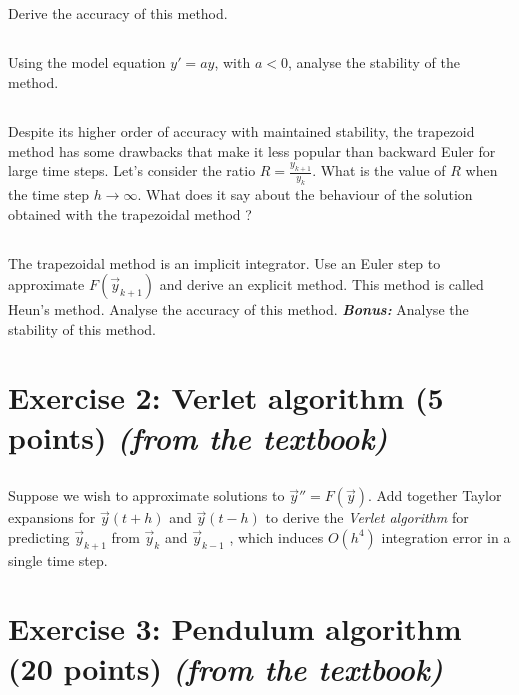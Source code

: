 \subsection{} Derive the accuracy of this method.

\subsection{} Using the model equation $y' = ay$, with $a < 0$, analyse the stability of the method.

\subsection{} Despite its higher order of accuracy with maintained stability, the trapezoid method has some drawbacks that make it less popular than backward Euler for large time steps. Let's consider the ratio $R = \frac{y_{k+1}}{y_k}$. What is the value of $R$ when the time step $h \to \infty$. What does it say about the behaviour of the solution obtained with the trapezoidal method ?

\subsection{} The trapezoidal method is an implicit integrator. Use an Euler step to approximate $F(\vec{y}_{k+1})$ and derive an explicit method. This method is called Heun's method. Analyse the accuracy of this method. \emph{\textbf{Bonus:}} Analyse the stability of this method.

\section*{Exercise 2: Verlet algorithm \normalsize \textnormal(5 points) \textit{(from the textbook)}}

\subsection{} Suppose we wish to approximate solutions to $\vec{y}'' = F(\vec{y})$. Add together Taylor expansions for $\vec{y}(t + h)$ and $\vec{y}(t - h)$ to derive the \emph{Verlet algorithm} for predicting $\vec{y}_{k+1}$ from $\vec{y}_k$  and $\vec{y}_{k-1}$ , which induces $O(h^4)$ integration error in a single time step.


\section*{Exercise 3: Pendulum algorithm \normalsize \textnormal(20 points) \textit{(from the textbook)}}

